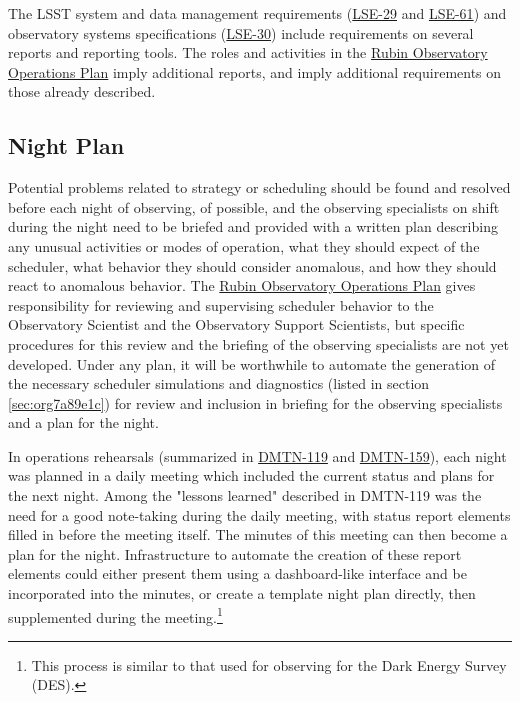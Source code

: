 The LSST system and data management requirements (\href{https://ls.st/lse-29}{LSE-29} and \href{https://ls.st/lse-61}{LSE-61}) and observatory systems specifications (\href{https://ls.st/lse-30}{LSE-30}) include requirements on several reports and reporting tools. The roles and activities in the \href{https://docushare.lsst.org/docushare/dsweb/Get/Document-36797/Rubin\%20Observatory\%20Operations\%20Plan\%20April\%202020.pdf}{Rubin Observatory Operations Plan} imply additional reports, and imply additional requirements on those already described.

\subsection{Night Plan}
\label{sec:orgb503941}

Potential problems related to strategy or scheduling should be found and resolved before each night of observing, of possible, and the observing specialists on shift during the night need to be briefed and provided with a written plan describing any unusual activities or modes of operation, what they should expect of the scheduler, what behavior they should consider anomalous, and how they should react to anomalous behavior.
The \href{https://docushare.lsst.org/docushare/dsweb/Get/Document-36797/Rubin\%20Observatory\%20Operations\%20Plan\%20April\%202020.pdf}{Rubin Observatory Operations Plan} gives responsibility for reviewing and supervising scheduler behavior to the Observatory Scientist and the Observatory Support Scientists, but specific procedures for this review and the briefing of the observing specialists are not yet developed.
Under any plan, it will be worthwhile to automate the generation of the necessary scheduler simulations and diagnostics (listed in section \ref{sec:org7a89e1c}) for review and inclusion in briefing for the observing specialists and a plan for the night.

In operations rehearsals (summarized in \href{https://dmtn-119.lsst.io}{DMTN-119} and \href{https://dmtn-159.lsst.io/}{DMTN-159}), each night was planned in a daily meeting which included the current status and plans for the next night.
Among the "lessons learned" described in DMTN-119 was the need for a good note-taking during the daily meeting, with status report elements filled in before the meeting itself. 
The minutes of this meeting can then become a plan for the night.
Infrastructure to automate the creation of these report elements could either present them using a dashboard-like interface and be incorporated into the minutes, or create a template night plan directly, then supplemented during the meeting.\footnote{This process is similar to that used for observing for the Dark Energy Survey (DES).}

